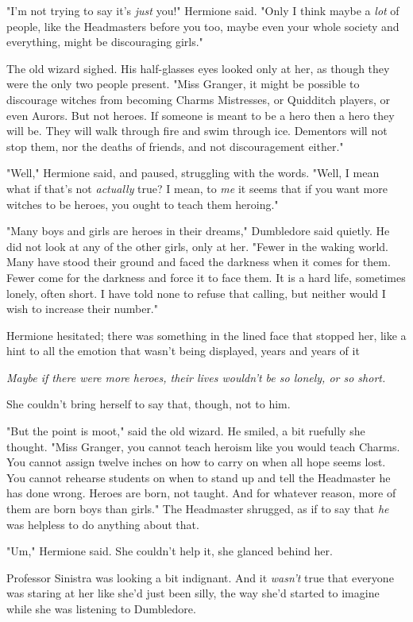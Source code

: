 "I'm not trying to say it's \emph{just} you!" Hermione said. "Only I think
maybe a \emph{lot} of people, like the Headmasters before you too, maybe even
your whole society and everything, might be discouraging girls."

The old wizard sighed. His half-glasses eyes looked only at her, as though they
were the only two people present. "Miss Granger, it might be possible to
discourage witches from becoming Charms Mistresses, or Quidditch players, or
even Aurors. But not heroes. If someone is meant to be a hero then a hero they
will be. They will walk through fire and swim through ice. Dementors will not
stop them, nor the deaths of friends, and not discouragement either."

"Well," Hermione said, and paused, struggling with the words. "Well, I
mean{\el} what if that's not \emph{actually} true? I mean, to \emph{me} it
seems that if you want more witches to be heroes, you ought to teach them
heroing."

"Many boys and girls are heroes in their dreams," Dumbledore said quietly. He
did not look at any of the other girls, only at her. "Fewer in the waking
world. Many have stood their ground and faced the darkness when it comes for
them. Fewer come for the darkness and force it to face them. It is a hard life,
sometimes lonely, often short. I have told none to refuse that calling, but
neither would I wish to increase their number."

Hermione hesitated; there was something in the lined face that stopped her,
like a hint to all the emotion that wasn't being displayed, years and years of
it{\el}

\emph{Maybe if there were more heroes, their lives wouldn't be so lonely, or so
short.}

She couldn't bring herself to say that, though, not to him.

"But the point is moot," said the old wizard. He smiled, a bit ruefully she
thought. "Miss Granger, you cannot teach heroism like you would teach Charms.
You cannot assign twelve inches on how to carry on when all hope seems lost.
You cannot rehearse students on when to stand up and tell the Headmaster he has
done wrong. Heroes are born, not taught. And for whatever reason, more of them
are born boys than girls." The Headmaster shrugged, as if to say that \emph{he}
was helpless to do anything about that.

"Um," Hermione said. She couldn't help it, she glanced behind her.

Professor Sinistra was looking a bit indignant. And it \emph{wasn't} true that
everyone was staring at her like she'd just been silly, the way she'd started
to imagine while she was listening to Dumbledore.


